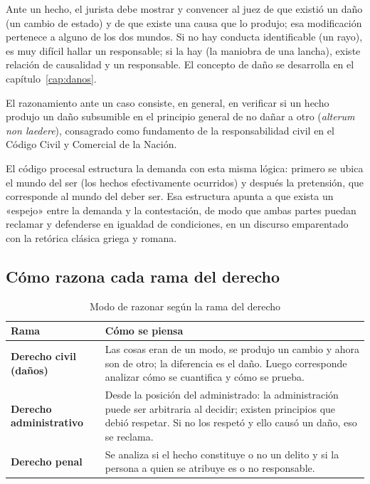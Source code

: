 \documentclass[12pt,oneside]{book}
\begin{document}
Ante un hecho, el jurista debe mostrar y convencer al juez de que existió un daño (un cambio de estado) y de que existe una causa que lo produjo; esa modificación pertenece a alguno de los dos mundos. Si no hay conducta identificable (un rayo), es muy difícil hallar un responsable; si la hay (la maniobra de una lancha), existe relación de causalidad y un responsable. El concepto de daño se desarrolla en el capítulo~\ref{cap:danos}.

\begin{importante}
El razonamiento ante un caso consiste, en general, en verificar si un hecho produjo un daño subsumible en el principio general de no dañar a otro (\emph{alterum non laedere}), consagrado como fundamento de la responsabilidad civil en el Código Civil y Comercial de la Nación.
\end{importante}

El código procesal estructura la demanda con esta misma lógica: primero se ubica el mundo del ser (los hechos efectivamente ocurridos) y después la pretensión, que corresponde al mundo del deber ser. Esa estructura apunta a que exista un «espejo» entre la demanda y la contestación, de modo que ambas partes puedan reclamar y defenderse en igualdad de condiciones, en un discurso emparentado con la retórica clásica griega y romana.

\subsection{Cómo razona cada rama del derecho}

\begin{table}[H]
\centering
\caption{Modo de razonar según la rama del derecho}
\begin{tabularx}{\textwidth}{>{\raggedright\arraybackslash\bfseries}p{} X}
\toprule
Rama & Cómo se piensa \\
\midrule
Derecho civil (daños) & Las cosas eran de un modo, se produjo un cambio y ahora son de otro; la diferencia es el daño. Luego corresponde analizar cómo se cuantifica y cómo se prueba. \\
Derecho administrativo & Desde la posición del administrado: la administración puede ser arbitraria al decidir; existen principios que debió respetar. Si no los respetó y ello causó un daño, eso se reclama. \\
Derecho penal & Se analiza si el hecho constituye o no un delito y si la persona a quien se atribuye es o no responsable. \\
\bottomrule
\end{tabularx}
\end{table}
\end{document}
